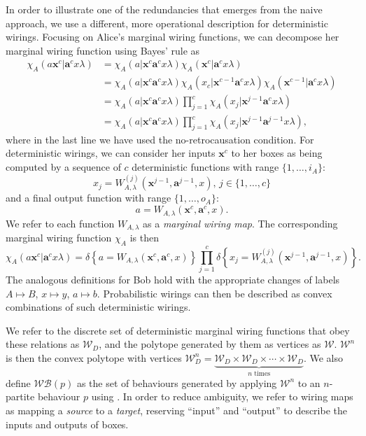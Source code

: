 \documentclass[10pt, a4paper]{article}
\numberwithin{equation}{section} %
\theoremstyle{definition}
\theoremstyle{plain}
\newcommand{\dintv}[2]{\mathopen\{#1,\ldots,#2\mathclose\}}
\newcommand{\?}{\mathrel{?}} %
\newcommand{\cvec}[1]{\boldsymbol{\mathbf{#1}}}    %
\newcommand{\indic}[1]{\delta{\left\{#1\right\}}} %
\newcommand{\sW}{\mathcal{W}}
\newcommand{\sWB}{\mathcal{WB}}
\begin{document}
      In order to illustrate one of the redundancies that emerges from the naive approach, we use a different, more operational description for deterministic wirings. Focusing on Alice's marginal wiring functions, we can decompose her marginal wiring function using Bayes' rule as
      \begin{align}
        \chi_A(a\cvec{x}^c|\cvec{a}^cx\lambda) &= \chi_A(a|\cvec{x}^c\cvec{a}^cx\lambda) \chi_A(\cvec{x}^{c}|\cvec{a}^cx\lambda) \\
        &= \chi_A(a|\cvec{x}^c\cvec{a}^cx\lambda) \chi_A(x_c|\cvec{x}^{c-1}\cvec{a}^cx\lambda) \chi_A(\cvec{x}^{c-1}|\cvec{a}^cx\lambda) \\
        &= \chi_A(a|\cvec{x}^c\cvec{a}^cx\lambda) \prod_{j=1}^c \chi_A(x_j|\cvec{x}^{j-1}\cvec{a}^cx\lambda) \\
        &= \chi_A(a|\cvec{x}^c\cvec{a}^{c}x\lambda) \prod_{j=1}^c \chi_A(x_j|\cvec{x}^{j-1}\cvec{a}^{j-1}x\lambda),
      \end{align}
      where in the last line we have used the no-retrocausation condition. For deterministic wirings, we can consider her inputs \(\cvec{x}^c\) to her boxes as being computed by a sequence of \(c\) deterministic functions with range \(\dintv{1}{i_A}\):
      \begin{equation} x_j = W^{(j)}_{A,\lambda}(\cvec{x}^{j-1}, \cvec{a}^{j-1}, x),\,j \in \dintv{1}{c} \end{equation}
      and a final output function with range \(\dintv{1}{o_A}\):
      \begin{equation} a = W_{A,\lambda}(\cvec{x}^{c}, \cvec{a}^{c}, x). \end{equation}
      We refer to each function \(W_{A,\lambda}\) as a \emph{marginal wiring map}. The corresponding marginal wiring function \(\chi_A\) is then
      \begin{equation}
        \chi_A(a\cvec{x}^c|\cvec{a}^cx\lambda) = \indic{a = W_{A,\lambda}(\cvec{x}^{c}, \cvec{a}^{c}, x)} \prod_{j=1}^c \indic{x_j = W^{(j)}_{A,\lambda}(\cvec{x}^{j-1}, \cvec{a}^{j-1}, x)}.
      \end{equation}
      The analogous definitions for Bob hold with the appropriate changes of labels \(A \mapsto B\), \(x \mapsto y\), \(a \mapsto b\). Probabilistic wirings can then be described as convex combinations of such deterministic wirings.

      We refer to the discrete set of deterministic marginal wiring functions that obey these relations as \(\sW_D\), and the polytope generated by them as vertices as \(\sW\). \(\sW^n\) is then the convex polytope with vertices \(\sW_D^n = \underbrace{\sW_D \times \sW_D \times \cdots \times \sW_D}_{n\text{ times}}\). We also define \(\sWB(p)\) as the set of behaviours generated by applying \(\sW^n\) to an \(n\)-partite behaviour \(p\) using . In order to reduce ambiguity, we refer to wiring maps as mapping a \emph{source} to a \emph{target}, reserving ``input'' and ``output'' to describe the inputs and outputs of boxes.
\end{document}

